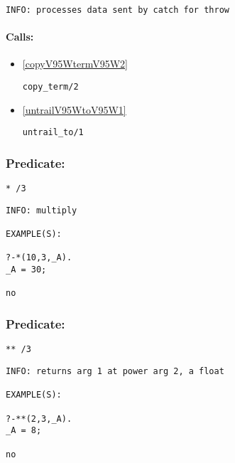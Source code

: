 {\small \begin{verbatim}
INFO: processes data sent by catch for throw

\end{verbatim}}
\paragraph{Calls:} 
\begin{itemize}
\item \ref{copyV95WtermV95W2} 
\begin{verbatim}
copy_term/2
\end{verbatim}

\item \ref{untrailV95WtoV95W1} 
\begin{verbatim}
untrail_to/1
\end{verbatim}

\end{itemize}

\subsubsection{Predicate:} \label{V42WV95W3}

\begin{verbatim}
* /3
\end{verbatim}

{\small \begin{verbatim}
INFO: multiply

EXAMPLE(S):

?-*(10,3,_A).
_A = 30;

no

\end{verbatim}}

\subsubsection{Predicate:} \label{V42WV42WV95W3}

\begin{verbatim}
** /3
\end{verbatim}

{\small \begin{verbatim}
INFO: returns arg 1 at power arg 2, a float

EXAMPLE(S):

?-**(2,3,_A).
_A = 8;

no

\end{verbatim}}

